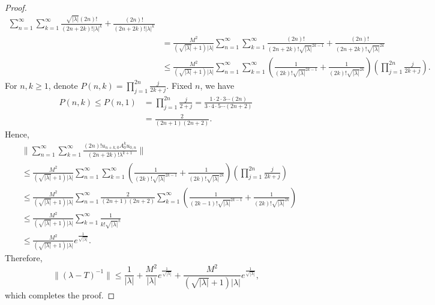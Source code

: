 \documentclass[12pt]{amsart}
\numberwithin{equation}{section}
\theoremstyle{plain}
\theoremstyle{definition}
\begin{document}
\begin{proof}
\begin{align*}
\sum\limits_{n=1}^{\infty}\sum\limits_{k=1}^{\infty}
\frac{\sqrt{|\lambda|}(2n)!}{(2n+2k)!|\lambda|^{k}}+\frac{(2n)!}{(2n+2k)!|\lambda|^{k}}\\
&=
\frac{M^2}{(\sqrt{|\lambda|}+1)|\lambda|}
\sum\limits_{n=1}^{\infty}\sum\limits_{k=1}^{\infty}\frac{(2n)!}{(2n+2k)!\sqrt{|\lambda|}^{2k-1}}+\frac{(2n)!}{(2n+2k)!\sqrt{|\lambda|}^{2k}}\\
&\leq
\frac{M^2}{(\sqrt{|\lambda|}+1)|\lambda|}
\sum\limits_{n=1}^{\infty}\sum\limits_{k=1}^{\infty}\left(\frac{1}{(2k)!\sqrt{|\lambda|}^{2k-1}}+\frac{1}{(2k)!\sqrt{|\lambda|}^{2k}}\right)\left(\prod\limits_{j=1}^{2n}\frac{j}{2k+j}\right).
\end{align*}
For $n,k\geq 1$, denote $P(n,k)=\prod\limits_{j=1}^{2n}\frac{j}{2k+j}$.
Fixed $n$, we have
\begin{align*}
P(n,k)\leq P(n,1)
&=\prod\limits_{j=1}^{2n}\frac{j}{2+j}
=\frac{1 \cdot 2 \cdot 3 \cdots (2n)}{3 \cdot 4 \cdot 5 \cdots (2n+2)}\\
&=\frac{2}{(2n+1)(2n+2)}.
\end{align*}
Hence,
\begin{align*}
&\|\sum\limits_{n=1}^{\infty}\sum\limits_{k=1}^{\infty}
\frac{(2n)!u_{n+k, 0}A_0^k u_{0,n}}{(2n+2k)!\lambda^{k+1}}\|\\
&\leq
\frac{M^2}{(\sqrt{|\lambda|}+1)|\lambda|}
\sum\limits_{n=1}^{\infty}\sum\limits_{k=1}^{\infty}\left(\frac{1}{(2k)!\sqrt{|\lambda|}^{2k-1}}+\frac{1}{(2k)!\sqrt{|\lambda|}^{2k}}\right)\left(\prod\limits_{j=1}^{2n}\frac{j}{2k+j}\right)\\
&\leq
\frac{M^2}{(\sqrt{|\lambda|}+1)|\lambda|}
\sum\limits_{n=1}^{\infty}\frac{2}{(2n+1)(2n+2)}\sum\limits_{k=1}^{\infty}\left(\frac{1}{(2k-1)!\sqrt{|\lambda|}^{2k-1}}+\frac{1}{(2k)!\sqrt{|\lambda|}^{2k}}\right)\\
&\leq
\frac{M^2}{(\sqrt{|\lambda|}+1)|\lambda|}
\sum\limits_{k=1}^{\infty}\frac{1}{k!\sqrt{|\lambda|}^{k}}\\
&\leq
\frac{M^2}{(\sqrt{|\lambda|}+1)|\lambda|}e^{\frac{1}{\sqrt{|\lambda|}}}.
\end{align*}
Therefore,
\begin{equation*}
\|(\lambda-T)^{-1}\|\leq \frac{1}{|\lambda|}+ \frac{M^2}{|\lambda|}e^{\frac{1}{\sqrt{|\lambda|}}}+
\frac{M^2}{(\sqrt{|\lambda|}+1)|\lambda|}e^{\frac{1}{\sqrt{|\lambda|}}},
\end{equation*}
which completes the proof.
\end{proof}
\end{document}
